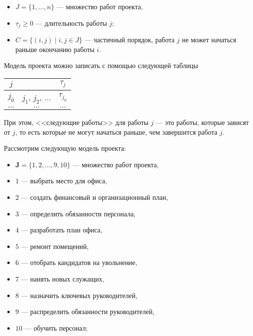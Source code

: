 \begin{itemize}[nosep]
	\item $J = \{1, \dots, n\}$ --- множество работ проекта,
	
	\item $\tau_{j} \ge 0$ --- длительность работы $j$;
	
	\item $C = \big\{(i, j) \; \big| \; i,j \in J\big\}$ --- частичный порядок, работа $j$ не может начаться раньше окончанию работы $i$.
\end{itemize}

Модель проекта можно записать с помощью следующей таблицы

\begin{table}[H]
	\centering
	\begin{tabular}{ | c | c | c | } 
		\hline
		$j$ & \text{следующие работы} & $\tau_j$ \\ \hline
		$j_0$ & $j_1$, $j_2$, $\dots$ & $\tau_{j_0}$ \\ \hline
		$\dots$ & $\dots$ & $\dots$ \\ \hline
	\end{tabular}
\end{table}

При этом, <<следующие работы>> для работы $j$ --- это работы, которые зависят от $j$, то есть которые не могут начаться раньше, чем завершится работа $j$.

\example\label{ex:office_project}

Рассмотрим следующую модель проекта:

\begin{itemize}[nosep]
	\item $\mathbf{J} = \{1, 2, \dots, 9, 10\}$ --- множество работ проекта,
	
	\item $1$ --- выбрать место для офиса,
	
	\item $2$ --- создать финансовый и организационный план,
	
	\item $3$ --- определить обязанности персонала,
	
	\item $4$ --- разработать план офиса,
	
	\item $5$ --- ремонт помещений,
	
	\item $6$ --- отобрать кандидатов на увольнение,
	
	\item $7$ --- нанять новых служащих,
	
	\item $8$ --- назначить ключевых руководителей,
	
	\item $9$ --- распределить обязанности руководителей,
	
	\item $10$ --- обучить персонал;
\end{itemize}

